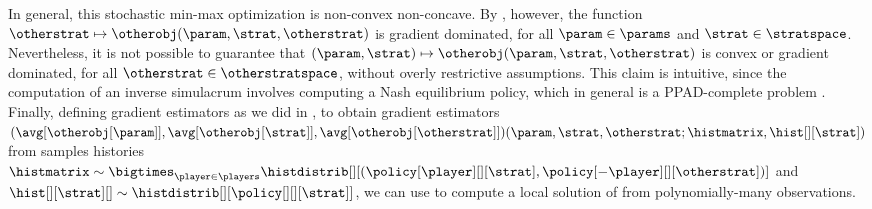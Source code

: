
In general, this stochastic min-max optimization is non-convex non-concave. 
By , however, the function $\otherstrat \mapsto \otherobj (\param, \strat, \otherstrat)$ is gradient dominated, for all $\param \in \params$ and $\strat \in \stratspace$.
Nevertheless, it is not possible to guarantee that $(\param, \strat) \mapsto \otherobj (\param, \strat, \otherstrat)$ is convex or gradient dominated, for all $\otherstrat \in \otherstratspace$, without overly restrictive assumptions.
This claim is intuitive, since the computation of an inverse simulacrum involves computing a Nash equilibrium policy, which in general is a PPAD-complete problem \citep{daskalakis2009complexity,foster2023hardness}.  
Finally, defining gradient estimators as we did in , to obtain gradient estimators $(\avg[{\otherobj[\param]}], \avg[{\otherobj[\strat]}], \avg[{\otherobj[\otherstrat]}])(\param, \strat, \otherstrat; \histmatrix, \hist[][\strat])$ from samples histories $\histmatrix \sim \bigtimes_{\player \in \players} \histdistrib[][{(\policy[\player][][\strat], \policy[-\player][][\otherstrat])}]$ and $\hist[][\strat][] \sim \histdistrib[][{\policy[][][\strat]}]$, we can use  to compute a local solution of  from polynomially-many observations.



